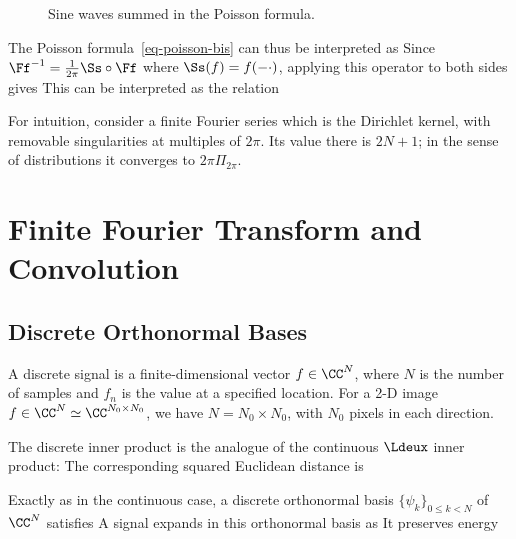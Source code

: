 \begin{figure}[tbp]
\centering
{}
\caption{Sine waves summed in the Poisson formula.}
\label{fig-review-fourier-poisson-distrib}
\end{figure}
The Poisson formula~\eqref{eq-poisson-bis} can thus be interpreted as
Since $\Ff^{-1} = \frac{1}{2\pi} \Ss \circ \Ff$ where $\Ss(f)=f(-\cdot)$, applying this operator to both sides gives
This can be interpreted as the relation

For intuition, consider a finite Fourier series
which is the Dirichlet kernel, with removable singularities at multiples of $2\pi$. Its value there is $2N+1$; in the sense of distributions it converges to $2\pi\Pi_{2\pi}$.

\section{Finite Fourier Transform and Convolution}
\label{sec-dft}

\subsection{Discrete Orthonormal Bases}

A discrete signal is a finite-dimensional vector $f \in \CC^N$, where $N$ is the number of samples and $f_n$ is the value at a specified location. For a 2-D image $f \in \CC^N \simeq \CC^{N_0 \times N_0}$, we have $N = N_0 \times N_0$, with $N_0$ pixels in each direction.

The discrete inner product is the analogue of the continuous $\Ldeux$ inner product:
The corresponding squared Euclidean distance is

Exactly as in the continuous case, a discrete orthonormal basis $\{ \psi_k \}_{0 \leq k < N }$ of $\CC^N$ satisfies
A signal expands in this orthonormal basis as
It preserves energy

